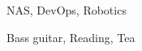 \documentclass[a4paper,12pt]{memoir} %
\begin{document}



{NAS, DevOps, Robotics}


{Bass guitar, Reading, Tea}


\Sep %

\end{document}
